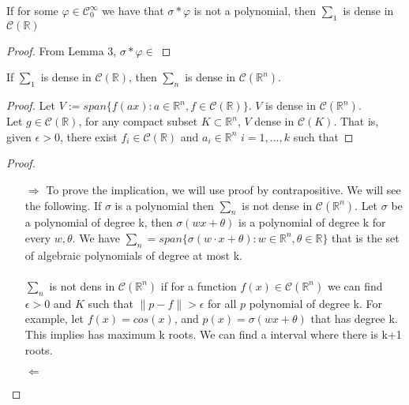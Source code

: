 \documentclass[../main.tex]{subfiles}
\begin{document}
	\begin{lema} %
		If for some $\varphi \in \mathcal{C}^\infty_0 $ we have that $\sigma \ast \varphi $ is not a polynomial, then $\sum_1$ is dense in $\mathcal{C}(\mathbb{R})$
	\end{lema}
	 \begin{proof}
	 From Lemma 3, $\sigma \ast \varphi \in$
	 \end{proof}
	 
	\begin{lema}  %
			If $\sum_1$ is dense in $\mathcal{C}(\mathbb{R})$, then $\sum_n$ is dense in $\mathcal{C}(\mathbb{R}^n)$.
		\end{lema}
	
	\begin{proof} %
			Let $V:= span\{ f(ax) : a \in \mathbb{R}^n, f \in \mathcal{C}(\mathbb{R}) \}$. $V$ is dense in $\mathcal{C}(\mathbb{R}^n)$. \\ 
			Let $g\in \mathcal{C}(\mathbb{R}) $, for any compact subset $K \subset \mathbb{R}^n  $, $V$ dense in $\mathcal{C}(K)$. That is, given $\epsilon >0$, there exist $f_i\in  \mathcal{C}(\mathbb{R})$ and $a_i \in \mathbb{R}^n $    {\scriptsize $i=1,...,k$}  such that
		\end{proof}
		
	\begin{proof}~ %

	\begin{enumerate}
		\item[$\Rightarrow$] To prove the implication, we will use proof by contrapositive. We will see the following. If $\sigma$ is a polynomial then $\sum_n$ is not dense in $\mathcal{C}(\mathbb{R}^n)$. Let $\sigma$ be a polynomial of degree k, then $\sigma(wx+\theta)$ is a polynomial  of degree k for every $w,\theta$. We have $ \sum_n = span\{\sigma(w\cdot x + \theta) : w\in \mathbb{R}^n, \theta \in \mathbb{R} \}$ that is the set of algebraic polynomials of degree at most k. \\ \\ $\sum_n$ is not dens in $\mathcal{C}(\mathbb{R}^n)$ if for a function $f(x)\in \mathcal{C}(\mathbb{R}^n)$ we can find $\epsilon > 0$ and $K$ such that  $\| p-f \| > \epsilon$ for all $p$ polynomial of degree k. For example, let $f(x)=cos(x)$, and $p(x)= \sigma(wx+\theta)$ that has degree k. This implies has maximum k roots. We can find a interval where there is k+1 roots. 
		
		\item[$\Leftarrow$]  
	\end{enumerate}
\end{proof}
	\cite{leshno1993multilayer}
\end{document}
